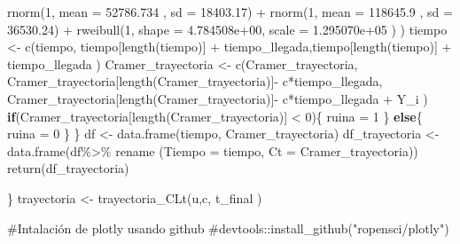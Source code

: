 \documentclass[
  us-letterpaper,
]{scrreprt}
\newenvironment{Shaded}{\begin{snugshade}}{\end{snugshade}}
\newcommand{\AttributeTok}[1]{\textcolor[rgb]{0.40,0.45,0.13}{#1}}
\newcommand{\CommentTok}[1]{\textcolor[rgb]{0.37,0.37,0.37}{#1}}
\newcommand{\ControlFlowTok}[1]{\textcolor[rgb]{0.00,0.23,0.31}{\textbf{#1}}}
\newcommand{\DecValTok}[1]{\textcolor[rgb]{0.68,0.00,0.00}{#1}}
\newcommand{\FloatTok}[1]{\textcolor[rgb]{0.68,0.00,0.00}{#1}}
\newcommand{\FunctionTok}[1]{\textcolor[rgb]{0.28,0.35,0.67}{#1}}
\newcommand{\NormalTok}[1]{\textcolor[rgb]{0.00,0.23,0.31}{#1}}
\newcommand{\OtherTok}[1]{\textcolor[rgb]{0.00,0.23,0.31}{#1}}
\newcommand{\SpecialCharTok}[1]{\textcolor[rgb]{0.37,0.37,0.37}{#1}}
\theoremstyle{definition}
\theoremstyle{plain}
\theoremstyle{plain}
\theoremstyle{remark}
\begin{document}
\begin{Shaded}
\begin{Highlighting}[]
            \FunctionTok{rnorm}\NormalTok{(}\DecValTok{1}\NormalTok{, }\AttributeTok{mean =} \FloatTok{52786.734}\NormalTok{  , }\AttributeTok{sd =} \FloatTok{18403.17}\NormalTok{)  }\SpecialCharTok{+} 
            \FunctionTok{rnorm}\NormalTok{(}\DecValTok{1}\NormalTok{, }\AttributeTok{mean =} \FloatTok{118645.9}\NormalTok{  , }\AttributeTok{sd =} \FloatTok{36530.24}\NormalTok{)   }\SpecialCharTok{+} 
    \FunctionTok{rweibull}\NormalTok{(}\DecValTok{1}\NormalTok{,  }\AttributeTok{shape =} \FloatTok{4.784508e+00}\NormalTok{, }\AttributeTok{scale =} \FloatTok{1.295070e+05}\NormalTok{ ) ) }
\NormalTok{    tiempo }\OtherTok{\textless{}{-}} \FunctionTok{c}\NormalTok{(tiempo, tiempo[}\FunctionTok{length}\NormalTok{(tiempo)] }\SpecialCharTok{+}
\NormalTok{                  tiempo\_llegada,tiempo[}\FunctionTok{length}\NormalTok{(tiempo)] }\SpecialCharTok{+}
\NormalTok{                  tiempo\_llegada ) }
\NormalTok{    Cramer\_trayectoria }\OtherTok{\textless{}{-}} \FunctionTok{c}\NormalTok{(Cramer\_trayectoria,}
\NormalTok{           Cramer\_trayectoria[}\FunctionTok{length}\NormalTok{(Cramer\_trayectoria)]}\SpecialCharTok{{-}} 
\NormalTok{                              c}\SpecialCharTok{*}\NormalTok{tiempo\_llegada,}
\NormalTok{          Cramer\_trayectoria[}\FunctionTok{length}\NormalTok{(Cramer\_trayectoria)]}\SpecialCharTok{{-}}
\NormalTok{                              c}\SpecialCharTok{*}\NormalTok{tiempo\_llegada }\SpecialCharTok{+}\NormalTok{  Y\_i )}
    \ControlFlowTok{if}\NormalTok{(Cramer\_trayectoria[}\FunctionTok{length}\NormalTok{(Cramer\_trayectoria)] }\SpecialCharTok{\textless{}} \DecValTok{0}\NormalTok{)\{}
\NormalTok{      ruina }\OtherTok{=} \DecValTok{1}
\NormalTok{    \}}
    \ControlFlowTok{else}\NormalTok{\{}
\NormalTok{      ruina }\OtherTok{=} \DecValTok{0}
\NormalTok{    \}}
\NormalTok{  \}}
\NormalTok{  df }\OtherTok{\textless{}{-}} \FunctionTok{data.frame}\NormalTok{(tiempo, Cramer\_trayectoria)}
\NormalTok{  df\_trayectoria }\OtherTok{\textless{}{-}} \FunctionTok{data.frame}\NormalTok{(df}\SpecialCharTok{\%\textgreater{}\%}\NormalTok{ rename}
\NormalTok{                               (}\AttributeTok{Tiempo =}\NormalTok{ tiempo, }
                                 \AttributeTok{Ct =}\NormalTok{ Cramer\_trayectoria))}
  \FunctionTok{return}\NormalTok{(df\_trayectoria)}
  
\NormalTok{\}}
\NormalTok{trayectoria }\OtherTok{\textless{}{-}} \FunctionTok{trayectoria\_CLt}\NormalTok{(u,c, t\_final )}

\CommentTok{\#Intalación de plotly usando github}
\CommentTok{\#devtools::install\_github("ropensci/plotly")}


\end{Highlighting}
\end{Shaded}
\end{document}
